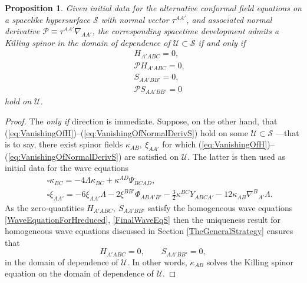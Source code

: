 \documentclass[10pt,a4paper]{article}
\theoremstyle{plain}
\newtheorem{proposition}{Proposition}
\begin{document}
\begin{proposition}\label{Prop:Propagation}
Given initial data for the alternative conformal field equations on a
spacelike hypersurface $\mathcal{S}$ with normal vector $\tau^{AA'}$,
and associated normal derivative
 $\mathcal{P}\equiv \tau^{AA'}\nabla_{AA'}$,
the corresponding spacetime development admits a Killing spinor in the
domain of dependence of $\mathcal{U}\subset\mathcal{S}$ if and only if
\begin{subequations}
\begin{eqnarray}
&& H_{A'ABC}=0,\label{eq:VanishingOfH}\\ && \mathcal{P}
  H_{A'ABC}=0,\label{eq:VanishingOfNormalDerivH}\\ &&
  S_{AA'BB'}=0,\label{eq:VanishingOfS}\\ &&\mathcal{P}
  S_{AA'BB'}=0 \label{eq:VanishingOfNormalDerivS}
\end{eqnarray}
\end{subequations}
 hold on $\mathcal{U}$.
\end{proposition}
\begin{proof}
The \emph{only if} direction is immediate. Suppose, on the other hand,
that (\ref{eq:VanishingOfH})--(\ref{eq:VanishingOfNormalDerivS}) hold
on some $\mathcal{U}\subset\mathcal{S}$ ---that is to say, there exist
spinor fields $\kappa_{AB},~\xi_{AA'}$ for which
(\ref{eq:VanishingOfH})--(\ref{eq:VanishingOfNormalDerivS}) are
satisfied on $\mathcal{U}$. The latter is then used as initial data
for the wave equations
\begin{eqnarray*} 
&& \square \kappa_{BC}=-4\Lambda\kappa_{BC} + \kappa^{AD}\Psi_{BCAD},
  \\ && \square \xi_{AA'}= - 6 \xi_{AA'} \Lambda - 2 \xi^{BB'}
  \Phi_{ABA'B'} - \tfrac{3}{2} \kappa^{BC} Y_{ABCA'} - 12 \kappa_{AB}
  \nabla^{B}{}_{A'}\Lambda.
\end{eqnarray*}
As the zero-quantities $H_{A'ABC},~S_{AA'BB'}$ satisfy the homogeneous
wave equations \eqref{WaveEquationForHreduced}, \eqref{FinalWaveEqS}
then the uniqueness result for homogeneous wave equations discussed in
Section \ref{TheGeneralStrategy} ensures that
\[ H_{A'ABC}=0,\qquad S_{AA'BB'}=0,\]
in the domain of dependence of $\mathcal{U}$. In other words,
$\kappa_{AB}$ solves the Killing spinor equation on the domain of
dependence of $\mathcal{U}$.
\end{proof}
\end{document}
